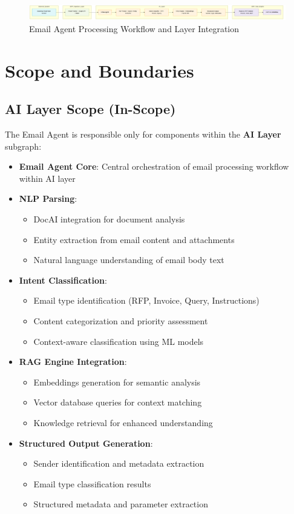 \documentclass[12pt]{report}
\begin{document}
\begin{figure}[htbp]
\centering
\includegraphics[width=\textwidth,height=1.2\textheight,keepaspectratio]{../../pics/email-agent.png}
\caption{Email Agent Processing Workflow and Layer Integration}
\label{fig:email-agent-workflow}
\end{figure}

\section{Scope and Boundaries}
\subsection{AI Layer Scope (In-Scope)}
The Email Agent is responsible only for components within the \textbf{AI Layer} subgraph:
\begin{itemize}
  \item \textbf{Email Agent Core}: Central orchestration of email processing workflow within AI layer
  \item \textbf{NLP Parsing}:
    \begin{itemize}
      \item DocAI integration for document analysis
      \item Entity extraction from email content and attachments
      \item Natural language understanding of email body text
    \end{itemize}
  \item \textbf{Intent Classification}:
    \begin{itemize}
      \item Email type identification (RFP, Invoice, Query, Instructions)
      \item Content categorization and priority assessment
      \item Context-aware classification using ML models
    \end{itemize}
  \item \textbf{RAG Engine Integration}:
    \begin{itemize}
      \item Embeddings generation for semantic analysis
      \item Vector database queries for context matching
      \item Knowledge retrieval for enhanced understanding
    \end{itemize}
  \item \textbf{Structured Output Generation}:
    \begin{itemize}
      \item Sender identification and metadata extraction
      \item Email type classification results
      \item Structured metadata and parameter extraction
    \end{itemize}
\end{itemize}
\end{document}
